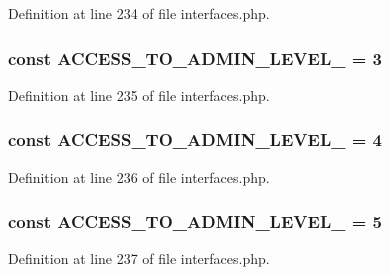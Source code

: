 Definition at line 234 of file interfaces.php.

\hypertarget{group__constants_ga6a8da045f81793625a0cb332106e71ba}{
\subsubsection[{ACCESS\_\-TO\_\-ADMIN\_\-LEVEL\_\-0}]{\setlength{\rightskip}{0pt plus 5cm}const ACCESS\_\-TO\_\-ADMIN\_\-LEVEL\_ = 3}}
\label{group__constants_ga6a8da045f81793625a0cb332106e71ba}


Definition at line 235 of file interfaces.php.

\hypertarget{group__constants_ga3b271ad21d11058b550be5ab9599cce3}{
\subsubsection[{ACCESS\_\-TO\_\-ADMIN\_\-LEVEL\_\-1}]{\setlength{\rightskip}{0pt plus 5cm}const ACCESS\_\-TO\_\-ADMIN\_\-LEVEL\_ = 4}}
\label{group__constants_ga3b271ad21d11058b550be5ab9599cce3}


Definition at line 236 of file interfaces.php.

\hypertarget{group__constants_gaff610796a797e6a609363e5ab6028ca0}{
\subsubsection[{ACCESS\_\-TO\_\-ADMIN\_\-LEVEL\_\-2}]{\setlength{\rightskip}{0pt plus 5cm}const ACCESS\_\-TO\_\-ADMIN\_\-LEVEL\_ = 5}}
\label{group__constants_gaff610796a797e6a609363e5ab6028ca0}


Definition at line 237 of file interfaces.php.

